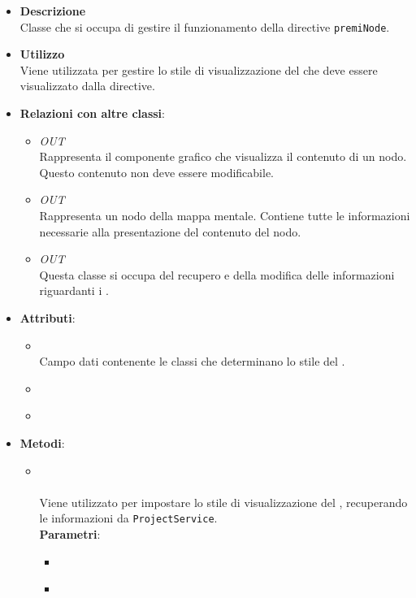 \begin{itemize}
\item \textbf{Descrizione}\\
Classe che si occupa di gestire il funzionamento della directive \texttt{premiNode}.
\item \textbf{Utilizzo}\\
Viene utilizzata per gestire lo stile di visualizzazione del  che deve essere visualizzato dalla directive.
\item \textbf{Relazioni con altre classi}:
\begin{itemize}
\item \textit{OUT} \hyperref[\nogloxy{Premi::Front-End::Directives::premiNode}]{}\\
Rappresenta il componente grafico che visualizza il contenuto di un nodo. Questo contenuto non deve essere modificabile.
\item \textit{OUT} \hyperref[\nogloxy{Premi::Front-End::Model::Node}]{}\\
Rappresenta un nodo della mappa mentale. Contiene tutte le informazioni necessarie alla presentazione del contenuto del nodo.
\item \textit{OUT} \hyperref[\nogloxy{Premi::Front-End::Services::ProjectService}]{}\\
Questa classe si occupa del recupero e della modifica delle informazioni riguardanti i .
\end{itemize}
\item \textbf{Attributi}:
\begin{itemize}
\item {}
\\ Campo dati contenente le classi  che determinano lo stile del .
\item {}
\\ \dpProjectServiceField
\item {}
\\ \dpScopeField
\end{itemize}
\item \textbf{Metodi}:
\begin{itemize}
\item {}
\\ \dpConstructor \\ Viene utilizzato per impostare lo stile di visualizzazione del , recuperando le informazioni da \texttt{ProjectService}.
\\ \textbf{Parametri}:
\begin{itemize}
\item {}
\\ \dpScopeParam
\item {}
\\ \dpProjectServiceParam
\end{itemize}
\end{itemize}
\end{itemize}
